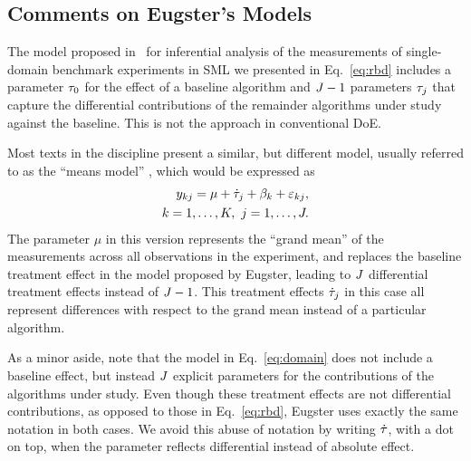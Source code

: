 \subsection{Comments on Eugster's Models}\label{sec:mixed}

The model proposed in~\citet{EugsterPhD}
for inferential analysis of the measurements of single-domain
benchmark experiments in SML we presented in
Eq.~\ref{eq:rbd} includes a parameter $\tau_{0}$ for 
the effect of a baseline algorithm and
$J-1$ parameters $\tau_{j}$ that capture
the differential contributions of the remainder algorithms
under study against the baseline.
%
This is not the approach in conventional DoE.

Most texts in the discipline present a similar, but different model,
usually referred to as the ``means model'' \citep{MontgomeryDAE},
which would be expressed as
%
\begin{align}
  \begin{split}
    y_{kj} = \mu + \dot{\tau}_{j} + 
      \beta_{k} + \varepsilon_{kj},\\
    k = 1,\dots,K,~j = 1,\dots,J.
    \label{eq:cbd_means}
  \end{split}
\end{align}
%
The parameter $\mu$ in this version represents the ``grand mean'' of the
measurements across all observations in the experiment,
and replaces the baseline treatment effect in the model proposed by Eugster,
leading to $J$ differential treatment effects instead of $J - 1$.
%
This treatment effects $\dot{\tau}_{j}$ in this case all 
represent differences with respect to the grand mean instead of
a particular algorithm.

As a minor aside, note that the model in Eq.~\ref{eq:domain} does
not include a baseline effect, but instead $J$ explicit parameters 
for the contributions of the algorithms under study.
%
Even though these treatment effects are not differential
contributions, as opposed to those in Eq.~\ref{eq:rbd},
Eugster uses exactly the same notation in both cases.
%
We avoid this abuse of notation by writing $\dot{\tau}$,
with a dot on top, when the parameter reflects differential instead of
absolute effect.


